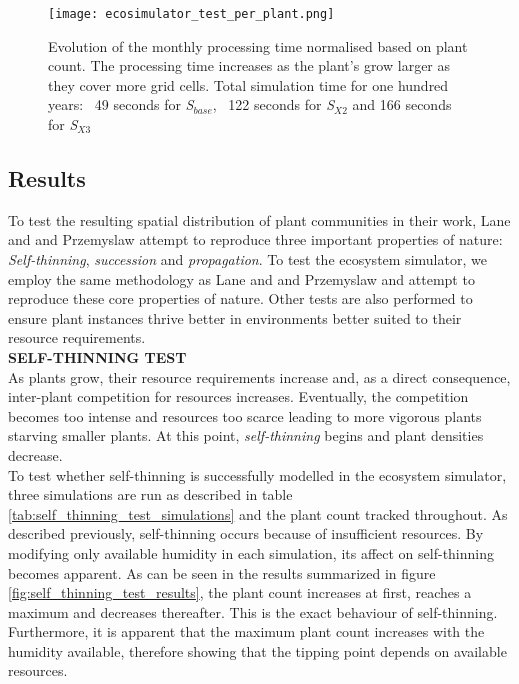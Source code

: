 \begin{figure}
\center
	\texttt{[image: ecosimulator\_test\_per\_plant.png]}
	\caption{ Evolution of the monthly processing time normalised based on plant count. The processing time increases as the plant's grow larger as they cover more grid cells. Total simulation time for one hundred years: ~49 seconds for \textit{S$_{base}$}, ~122 seconds for \textit{S$_{X2}$} and 166 seconds for \textit{S$_{X3}$}}
	\label{fig:ecosimulator_test_per_plant}
\end{figure}

\subsection{Results} \label{subsec:ecosystem_simulator_results}

To test the resulting spatial distribution of plant communities in their work, Lane and and Przemyslaw \cite{Lane2002} attempt to reproduce three important properties of nature: \textit{Self-thinning}, \textit{succession} and \textit{propagation}. To test the ecosystem simulator, we employ the same methodology as Lane and and Przemyslaw \cite{Lane2002} and attempt to reproduce these core properties of nature. Other tests are also performed to ensure plant instances thrive better in environments better suited to their resource requirements.\\

\textbf{SELF-THINNING TEST}\\

As plants grow, their resource requirements increase and, as a direct consequence, inter-plant competition for resources increases. Eventually, the competition becomes too intense and resources too scarce leading to more vigorous plants starving smaller plants. At this point, \textit{self-thinning} begins and plant densities decrease.\\
To test whether self-thinning is successfully modelled in the ecosystem simulator, three simulations are run as described in table \ref{tab:self_thinning_test_simulations} and the plant count tracked throughout. As described previously, self-thinning occurs because of insufficient resources. By modifying only available humidity in each simulation, its affect on self-thinning becomes apparent. As can be seen in the results summarized in figure \ref{fig:self_thinning_test_results}, the plant count increases at first, reaches a maximum and decreases thereafter. This is the exact behaviour of self-thinning. Furthermore, it is apparent that the maximum plant count increases with the humidity available, therefore showing that the tipping point depends on available resources.\\

